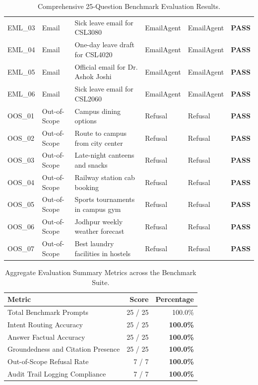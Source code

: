 \documentclass[10pt,a4paper]{article}
\begin{document}
\begin{table}[htbp]
\begin{tabularx}{\textwidth}{llXllc}
EML\_03 & Email & Sick leave email for CSL3080 & EmailAgent & EmailAgent & \textbf{PASS} \\
EML\_04 & Email & One-day leave draft for CSL4020 & EmailAgent & EmailAgent & \textbf{PASS} \\
EML\_05 & Email & Official email for Dr. Ashok Joshi & EmailAgent & EmailAgent & \textbf{PASS} \\
EML\_06 & Email & Sick leave email for CSL2060 & EmailAgent & EmailAgent & \textbf{PASS} \\
\midrule
OOS\_01 & Out-of-Scope & Campus dining options & Refusal & Refusal & \textbf{PASS} \\
OOS\_02 & Out-of-Scope & Route to campus from city center & Refusal & Refusal & \textbf{PASS} \\
OOS\_03 & Out-of-Scope & Late-night canteens and snacks & Refusal & Refusal & \textbf{PASS} \\
OOS\_04 & Out-of-Scope & Railway station cab booking & Refusal & Refusal & \textbf{PASS} \\
OOS\_05 & Out-of-Scope & Sports tournaments in campus gym & Refusal & Refusal & \textbf{PASS} \\
OOS\_06 & Out-of-Scope & Jodhpur weekly weather forecast & Refusal & Refusal & \textbf{PASS} \\
OOS\_07 & Out-of-Scope & Best laundry facilities in hostels & Refusal & Refusal & \textbf{PASS} \\
\bottomrule
\end{tabularx}
\caption{Comprehensive 25-Question Benchmark Evaluation Results.}
\label{tab:results}
\end{table}

\begin{table}[htbp]
\centering\small
\begin{tabular}{lrr}
\toprule
\textbf{Metric} & \textbf{Score} & \textbf{Percentage} \\
\midrule
Total Benchmark Prompts & 25 / 25 & 100.0\% \\
Intent Routing Accuracy & 25 / 25 & \textbf{100.0\%} \\
Answer Factual Accuracy & 25 / 25 & \textbf{100.0\%} \\
Groundedness and Citation Presence & 25 / 25 & \textbf{100.0\%} \\
Out-of-Scope Refusal Rate & 7 / 7 & \textbf{100.0\%} \\
Audit Trail Logging Compliance & 7 / 7 & \textbf{100.0\%} \\
\bottomrule
\end{tabular}
\caption{Aggregate Evaluation Summary Metrics across the Benchmark Suite.}
\label{tab:summary}
\end{table}
\end{document}

